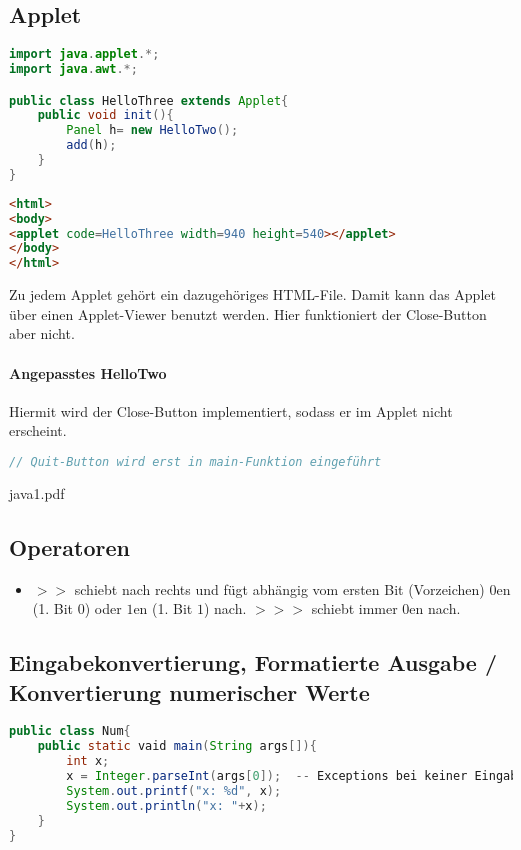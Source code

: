 \subsection{Applet}
\begin{lstlisting}[language=Java]
import java.applet.*;
import java.awt.*;

public class HelloThree extends Applet{
	public void init(){
		Panel h= new HelloTwo();
		add(h);
	}
}
\end{lstlisting}
\begin{lstlisting}[language=HTML]
<html>
<body>
<applet code=HelloThree width=940 height=540></applet>
</body>
</html>
\end{lstlisting}
Zu jedem Applet gehört ein dazugehöriges HTML-File. Damit kann das Applet über einen Applet-Viewer benutzt werden. Hier funktioniert der Close-Button aber nicht. 
\paragraph{Angepasstes HelloTwo} Hiermit wird der Close-Button implementiert, sodass er im Applet nicht erscheint.
\begin{lstlisting}[language=Java]
// Quit-Button wird erst in main-Funktion eingeführt
\end{lstlisting}
java1.pdf
\subsection{Operatoren}
\begin{itemize}
\item $>>$ schiebt nach rechts und fügt abhängig vom ersten Bit (Vorzeichen) $0$en (1. Bit $0$) oder $1$en (1. Bit $1$) nach. $>>>$ schiebt immer $0$en nach.
\end{itemize}

\subsection[Eingabekonvertierung, Formatierte Ausgabe]{Eingabekonvertierung, Formatierte Ausgabe / Konvertierung numerischer Werte}
\begin{lstlisting}[language=Java]
public class Num{
	public static vaid main(String args[]){
		int x;
		x = Integer.parseInt(args[0]);	-- Exceptions bei keiner Eingabe und bspw. String-Eingabe
		System.out.printf("x: %d", x);
		System.out.println("x: "+x);
	}
}
\end{lstlisting}

